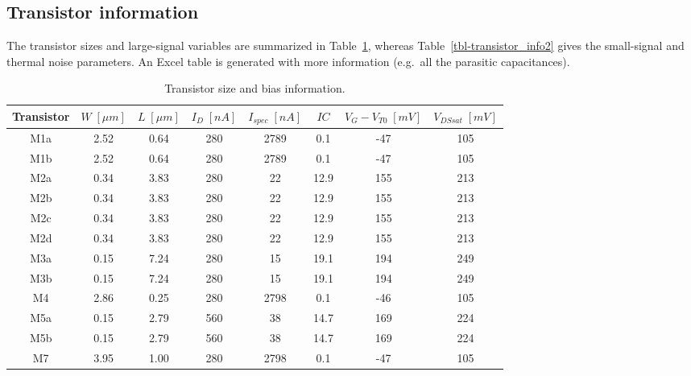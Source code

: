 \documentclass[
  a4paper,
  DIV=11,
  numbers=noendperiod]{scrreprt}
\begin{document}
\subsection{Transistor information}\label{transistor-information}

The transistor sizes and large-signal variables are summarized in
Table~\ref{tbl-transistor_info1}, whereas
Table~\ref{tbl-transistor_info2} gives the small-signal and thermal
noise parameters. An Excel table is generated with more information
(e.g.~all the parasitic capacitances).

\begin{longtable}[]{@{}cccccccc@{}}

\caption{\label{tbl-transistor_info1}Transistor size and bias
information.}

\tabularnewline

\toprule\noalign{}
Transistor & \(W\;[\mu m]\) & \(L\;[\mu m]\) & \(I_D\;[nA]\) &
\(I_{{spec}}\;[nA]\) & \(IC\) & \(V_G-V_{{T0}}\;[mV]\) &
\(V_{{DSsat}}\;[mV]\) \\
\midrule\noalign{}
\endhead
\bottomrule\noalign{}
\endlastfoot
M1a & 2.52 & 0.64 & 280 & 2789 & 0.1 & -47 & 105 \\
M1b & 2.52 & 0.64 & 280 & 2789 & 0.1 & -47 & 105 \\
M2a & 0.34 & 3.83 & 280 & 22 & 12.9 & 155 & 213 \\
M2b & 0.34 & 3.83 & 280 & 22 & 12.9 & 155 & 213 \\
M2c & 0.34 & 3.83 & 280 & 22 & 12.9 & 155 & 213 \\
M2d & 0.34 & 3.83 & 280 & 22 & 12.9 & 155 & 213 \\
M3a & 0.15 & 7.24 & 280 & 15 & 19.1 & 194 & 249 \\
M3b & 0.15 & 7.24 & 280 & 15 & 19.1 & 194 & 249 \\
M4 & 2.86 & 0.25 & 280 & 2798 & 0.1 & -46 & 105 \\
M5a & 0.15 & 2.79 & 560 & 38 & 14.7 & 169 & 224 \\
M5b & 0.15 & 2.79 & 560 & 38 & 14.7 & 169 & 224 \\
M7 & 3.95 & 1.00 & 280 & 2798 & 0.1 & -47 & 105 \\

\end{longtable}
\end{document}
